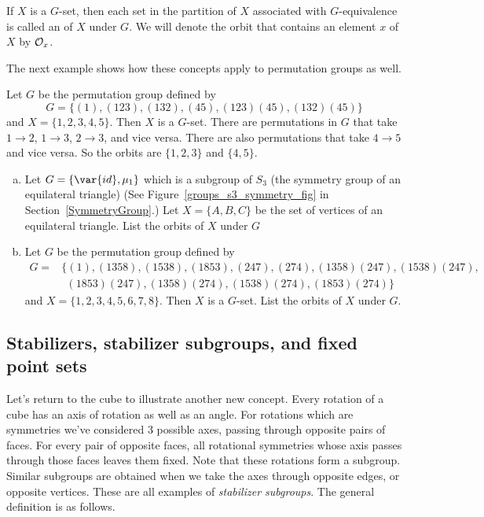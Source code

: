 \begin{defn} \label{noteorbit}
If $X$ is a $G$-set, then each set in the partition of $X$ associated with
$G$-equivalence is called an of $X$ under $G$. We will denote the orbit that contains an element $x$ of $X$ by
${\cal O}_x$. 
\end {defn}
The next example shows how these concepts apply to permutation groups as well.

\begin{example}\label{example:actions:Orbit1}
Let $G$ be the permutation group defined by
\[
G =\{(1), (1 23), (1 3 2), (4 5), (1 2 3)(4 5), (1 3 2)(4 5) \}
\]
and $X = \{ 1, 2, 3, 4, 5\}$. Then $X$ is a $G$-set. There are permutations in $G$ that take $1\rightarrow2$, $1\rightarrow3$, $2\rightarrow3$, and vice versa. There are also permutations that take $4\rightarrow 5$ and vice versa.  So the orbits are $\{1, 2, 3\}$ and $\{4, 5\}$. 
\end{example} 
 
\begin{exercise}\label{exercise:actions:orbits2}
\begin{enumerate}[(a)]
\item Let $G=\{\var{id},\mu_1\}$ which is a subgroup of $S_3$ (the symmetry group of an equilateral triangle) (See Figure~\ref{groups_s3_symmetry_fig} in Section~\ref{SymmetryGroup}.) Let $X=\{A,B,C\}$ be the set of vertices of an equilateral triangle. List the orbits of $X$ under $G$
\item Let $G$ be the permutation group defined by
\begin{align*}
G =&\{(1), (1358),(1538), (1853), (247),(274), (1358)(247),(1538)(247),\\
&~~ (1853)(247),(1358)(274),(1538)(274),(1853)(274) \}
\end{align*}
and $X = \{ 1, 2, 3, 4, 5,6,7,8\}$. Then $X$ is a $G$-set.  List the orbits of $X$ under $G$.
\end{enumerate}
\end {exercise}


\subsection{Stabilizers, stabilizer subgroups, and fixed point sets}

 Let's return to the cube to illustrate another new concept. Every rotation of a cube has an axis of rotation as well as an angle.   
 For rotations which are symmetries we've considered 3 possible axes, passing through opposite pairs of faces. 
For every pair of opposite faces, all rotational symmetries whose axis passes through those faces leaves them fixed.   Note that these rotations form a subgroup.  Similar subgroups are obtained when we take the axes through opposite edges, or opposite vertices. These are all examples of \emph{stabilizer subgroups}. The general definition is as follows.

